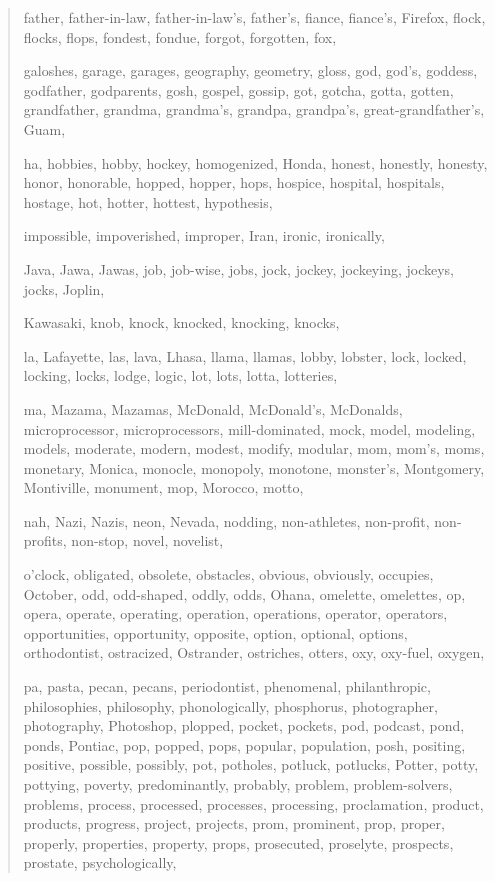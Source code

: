 \begin{quote}
    father, father-in-law, father-in-law's, father's, fiance, fiance's, Firefox, flock, flocks, flops, fondest, fondue, forgot, forgotten, fox,
    
    galoshes, garage, garages, geography, geometry, gloss, god, god's, goddess, godfather, godparents, gosh, gospel, gossip, got, gotcha, gotta, gotten, grandfather, grandma, grandma's, grandpa, grandpa's, great-grandfather's, Guam, 
    
    ha, hobbies, hobby, hockey, homogenized, Honda, honest, honestly, honesty, honor, honorable, hopped, hopper, hops, hospice, hospital, hospitals, hostage, hot, hotter, hottest, hypothesis, 
    
    impossible, impoverished, improper, Iran, ironic, ironically, 
    
    Java, Jawa, Jawas, job, job-wise, jobs, jock, jockey, jockeying, jockeys, jocks, Joplin,
    
    Kawasaki, knob, knock, knocked, knocking, knocks, 
    
    la, Lafayette, las, lava, Lhasa, llama, llamas, lobby, lobster, lock, locked, locking, locks, lodge, logic, lot, lots, lotta, lotteries, 
    
    ma, Mazama, Mazamas, McDonald, McDonald's, McDonalds, microprocessor, microprocessors, mill-dominated, mock, model, modeling, models, moderate, modern, modest, modify, modular, mom, mom's, moms, monetary, Monica, monocle, monopoly, monotone, monster's, Montgomery, Montiville, monument, mop, Morocco, motto, 
    
    nah, Nazi, Nazis, neon, Nevada, nodding, non-athletes, non-profit, non-profits, non-stop, novel, novelist, 
    
    o'clock, obligated, obsolete, obstacles, obvious, obviously, occupies, October, odd, odd-shaped, oddly, odds, Ohana, omelette, omelettes, op, opera, operate, operating, operation, operations, operator, operators, opportunities, opportunity, opposite, option, optional, options, orthodontist, ostracized, Ostrander, ostriches, otters, oxy, oxy-fuel, oxygen, 
    
    pa, pasta, pecan, pecans, periodontist, phenomenal, philanthropic, philosophies, philosophy, phonologically, phosphorus, photographer, photography, Photoshop, plopped, pocket, pockets, pod, podcast, pond, ponds, Pontiac, pop, popped, pops, popular, population, posh, positing, positive, possible, possibly, pot, potholes, potluck, potlucks, Potter, potty, pottying, poverty, predominantly, probably, problem, problem-solvers, problems, process, processed, processes, processing, proclamation, product, products, progress, project, projects, prom, prominent, prop, proper, properly, properties, property, props, prosecuted, proselyte, prospects, prostate, psychologically, 
    

\end{quote}
